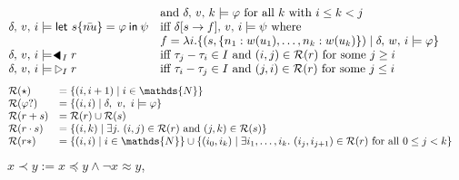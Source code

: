 \begin{figure}
\[\begin{array}{@{}ll@{\;\;}@{\;\;}ll@{}}
			                                                              & \text{and } \delta,\,v,\,k \models \varphi \text{ for all \(k\) with \(i \leq k < j\)}                                       &   & \\
			\delta,\,v,\,i \models \mfodlLetin{s\{\bar{nu}\}}{\phi}{\psi} & \multicolumn{3}{l@{}}{\text{iff } \delta[s \rightarrow f],\,v,\,i \models \psi\text{ where} }                                      \\
			                                                              & f=\lambda i.\{(s,\{n_1:w(u_1),\ldots,n_k:w(u_k)\}) \mid \delta,\,w,\,i \models \phi\}                                        &   & \\
			\delta,\,v,\,i \models \matchMP{r}{I}                         & \multicolumn{3}{l@{}}{\text{iff } \tau_j - \tau_i \in I \text{ and } (i, j)\in \mathcal{R}(r) \text{ for some } j \geq i   }       \\
			\delta,\,v,\,i \models \matchMF{r}{I}                         & \multicolumn{3}{l@{}}{\text{iff } \tau_i - \tau_j \in I \text{ and } (j, i)\in \mathcal{R}(r) \text{ for some } j \leq i   }       \\
		\end{array}
	\]
	\[
		\begin{array}{@{}ll@{\;\;}@{\;\;}ll@{}}
			\mathcal{R}(\star)     & = \{ (i, i+1) \mid i \in \mathds{N} \}                                                                                                                                         \\
			\mathcal{R}(\phi?)     & = \{ (i, i) \mid \delta,\ v,\ i \models \phi \}                                                                                                                                \\
			\mathcal{R}(r + s)     & = \mathcal{R}(r) \cup \mathcal{R}(s)                                                                                                                                           \\
			\mathcal{R}(r \cdot s) & = \left\{ (i, k) \mid \exists j.\ (i,j) \in \mathcal{R}(r) \text{ and } (j,k) \in \mathcal{R}(s) \right\}                                                                      \\
			\mathcal{R}(r*)        & = \left\{ (i, i) \mid i \in \mathds{N} \right\} \cup \left\{ (i_0,i_k) \mid \exists i_1,\dots, i_k .\ (i_j, i_{j+1}) \in \mathcal{R}(r) \text{ for all } 0 \leq j < k \right\}
		\end{array}
	\]
	$x \prec y := x \preceq y \land \neg x \approx y$,

\end{figure}
